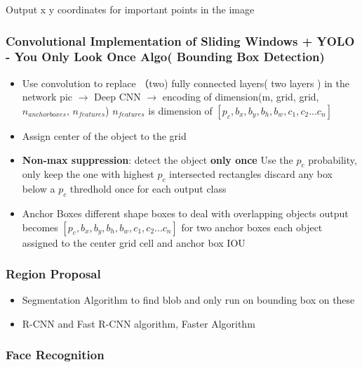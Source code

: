\documentclass[11pt, openany]{book}              %
\begin{document}
Output x y coordinates for important points in the image

\subsubsection{Convolutional Implementation of Sliding Windows + YOLO - You Only Look Once Algo( Bounding Box Detection)}

\begin{itemize}
\item Use convolution to replace （two) fully connected layers( two layers ) in the network
	\subitem pic $\rightarrow$ Deep CNN  $\rightarrow$ encoding of dimension(m, grid, grid, $n_{anchor boxes}$, $n_{features}$)
	\subitem $n_{features}$ is dimension of $[p_c, b_x,b_y,b_h,b_w, c_1,c_2...c_n]$
\item Assign center of the object to the grid
\item \textbf{Non-max suppression}: detect the object \textbf{only once}
	\subitem Use the $p_c$ probability, only keep the one with highest $p_c$ intersected rectangles
	\subitem discard any box below a $p_c$ thredhold
	\subitem once for each output class
\item Anchor Boxes
	\subitem different shape boxes to deal with overlapping objects
	\subitem output becomes $[p_c, b_x,b_y,b_h,b_w, c_1,c_2...c_n]$ for two anchor boxes
	\subitem each object assigned to the center grid cell and anchor box IOU
\end{itemize}

\subsubsection{Region Proposal}
\begin{itemize}
	\item Segmentation Algorithm to find blob and only run on bounding box on these
	\item R-CNN and Fast R-CNN algorithm, Faster Algorithm
\end{itemize}

\subsubsection{Face Recognition}
\end{document}
